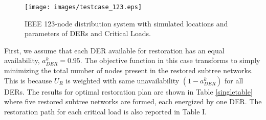\documentclass[12pt]{article}
\begin{document}
	   \begin{figure}[t]
        \centering
        \texttt{[image: images/testcase\_123.eps]}
        \vspace{-0.3cm}
        \caption{IEEE 123-node distribution system with simulated locations and parameters of DERs and Critical Loads.}
        \label{fig:ieee123}
    \end{figure}
    
    First, we assume that each DER available for restoration has an equal availability, $a_{DER}^k = 0.95$. The objective function in this case transforms to simply minimizing the total number of nodes present in the restored subtree networks. This is because $U_R$ is weighted with same unavailability $(1-a^k_{DER})$ for all DERs. The results for optimal restoration plan are shown in Table \ref{singletable} where five restored subtree networks are formed, each energized by one DER. The restoration path for each critical load is also reported in Table I.
\end{document}
